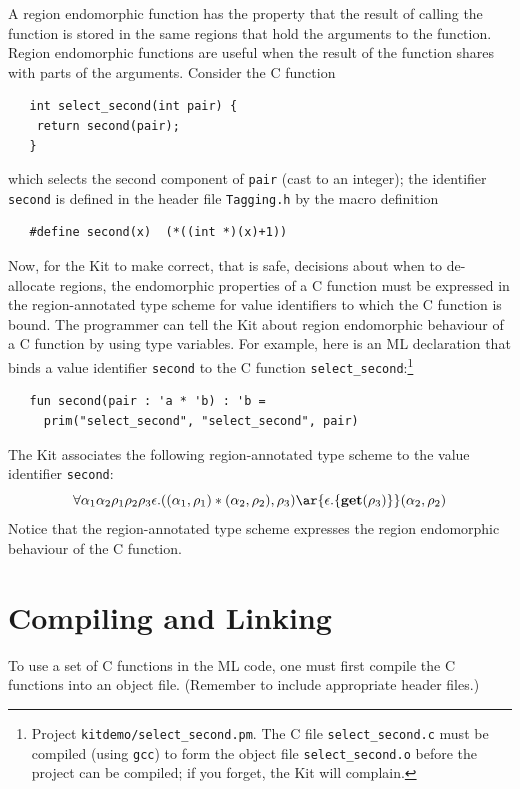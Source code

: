 \documentclass[12pt]{book}
\begin{document}
A region endomorphic function has the property that the result of
calling the function is stored in the same regions that hold the
arguments to the function. Region endomorphic functions are useful
when the result of the function shares with parts of the arguments.
Consider the C function
\begin{verbatim}
   int select_second(int pair) {
    return second(pair);
   }
\end{verbatim}
which selects the second component of {\tt pair} (cast to an
integer); the identifier {\tt second} is defined in the header
file {\tt Tagging.h} by the macro definition
\begin{verbatim}
   #define second(x)  (*((int *)(x)+1))
\end{verbatim}

Now, for the Kit to make correct, that is safe, decisions about when
to de-allocate regions, the endomorphic properties of a C function
must be expressed in the region-annotated type scheme for value identifiers
to which the C function is bound. The programmer can tell the Kit
about region endomorphic behaviour of a C function by using type
variables.  For example, here is an ML declaration that binds a value
identifier {\tt second} to the C function
\verb|select_second|:\footnote{Project {\tt kitdemo/select\_second.pm}. The C
  file {\tt select\_second.c} must be compiled (using {\tt gcc}) to
  form the object file {\tt select\_second.o} before the project can
  be compiled; if you forget, the Kit will complain.}
\begin{verbatim}
   fun second(pair : 'a * 'b) : 'b =
     prim("select_second", "select_second", pair)
\end{verbatim}
The Kit associates the following region-annotated type scheme to the value
identifier {\tt second}:
$$\forall \alpha_1\alpha_2\rho_1\rho_2\rho_3\epsilon.((\alpha_1,
\rho_1) * (\alpha_2, \rho_2), \rho_3) \ar{\epsilon.\{\Get(\rho_3)\}} (\alpha_2,
\rho_2)$$
Notice that the region-annotated type scheme expresses the region endomorphic
behaviour of the C function.

 
\section{Compiling and Linking}
\label{comp_and_link_with_C.sec}
To use a set of C functions in the ML code, one must first compile the
C functions into an object file. (Remember to include appropriate
header files.)
\end{document}
